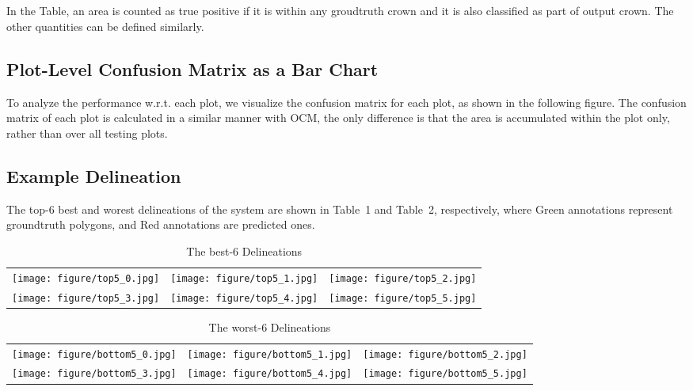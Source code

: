 \documentclass[]{report}   %
\begin{document}

\\\\
\noindent In the Table, an area is counted as true positive if it is within any groudtruth crown and it is also classified as part of output crown. The other quantities can be defined similarly.

\subsection*{Plot-Level Confusion Matrix as a Bar Chart}
To analyze the performance w.r.t. each plot, we visualize the confusion matrix for each plot, as shown in the following figure. The confusion matrix of each plot is calculated in a similar manner with OCM, the only difference is that the area is accumulated within the plot only, rather than over all testing plots.
\begin{figure}[H]
    \centering
    \def\svgwidth{0.9\columnwidth}
    
\end{figure}


\subsection*{Example Delineation}
The top-6 best and worest delineations of the system are shown in Table~1 and Table~2, respectively, where Green annotations represent groundtruth polygons, and Red annotations are predicted ones.

\begin{table*}
\label{tab:top3}
\caption{The best-6 Delineations}
\center
\begin{tabular}{lll}
\\
\texttt{[image: figure/top5\_0.jpg]} & \texttt{[image: figure/top5\_1.jpg]} & \texttt{[image: figure/top5\_2.jpg]} \\
\texttt{[image: figure/top5\_3.jpg]} & \texttt{[image: figure/top5\_4.jpg]} & \texttt{[image: figure/top5\_5.jpg]} \\
\end{tabular}
\end{table*}

\begin{table*}
\label{tab:top3}
\caption{The worst-6 Delineations}
\center
\begin{tabular}{lll}
\\
\texttt{[image: figure/bottom5\_0.jpg]} & \texttt{[image: figure/bottom5\_1.jpg]} & \texttt{[image: figure/bottom5\_2.jpg]} \\
\texttt{[image: figure/bottom5\_3.jpg]} & \texttt{[image: figure/bottom5\_4.jpg]} & \texttt{[image: figure/bottom5\_5.jpg]} \\
\end{tabular}
\end{table*}
\end{document}
